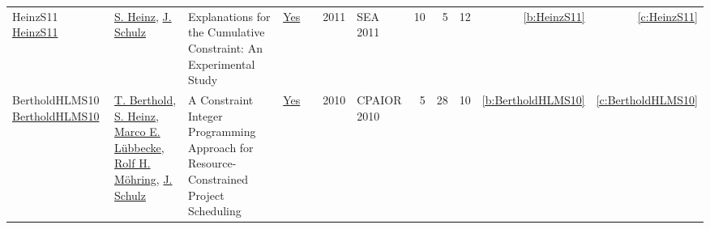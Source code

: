 {\begin{longtable}{>{\raggedright\arraybackslash}p{3cm}>{\raggedright\arraybackslash}p{6cm}>{\raggedright\arraybackslash}p{6.5cm}rrrp{2.5cm}rrrrr}
HeinzS11 \href{https://doi.org/10.1007/978-3-642-20662-7\_34}{HeinzS11} & \hyperref[auth:a134]{S. Heinz}, \hyperref[auth:a135]{J. Schulz} & Explanations for the Cumulative Constraint: An Experimental Study & \href{../works/HeinzS11.pdf}{Yes} & \cite{HeinzS11} & 2011 & SEA 2011 & 10 & 5 & 12 & \ref{b:HeinzS11} & \ref{c:HeinzS11}\\
BertholdHLMS10 \href{https://doi.org/10.1007/978-3-642-13520-0\_34}{BertholdHLMS10} & \hyperref[auth:a357]{T. Berthold}, \hyperref[auth:a134]{S. Heinz}, \hyperref[auth:a358]{Marco E. L{\"{u}}bbecke}, \hyperref[auth:a359]{Rolf H. M{\"{o}}hring}, \hyperref[auth:a135]{J. Schulz} & A Constraint Integer Programming Approach for Resource-Constrained Project Scheduling & \href{../works/BertholdHLMS10.pdf}{Yes} & \cite{BertholdHLMS10} & 2010 & CPAIOR 2010 & 5 & 28 & 10 & \ref{b:BertholdHLMS10} & \ref{c:BertholdHLMS10}\\
\end{longtable}
}

\clearpage
